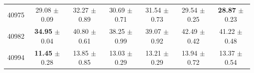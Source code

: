 \begin{table}[t]
\begin{tabular*}{\textwidth}{@{\extracolsep{\fill}}rcccccc@{}}
40975 & 29.08 $\pm$ 0.09 & 32.27 $\pm$ 0.89 & 30.69 $\pm$ 0.71 & 31.54 $\pm$ 0.73 & 29.54 $\pm$ 0.25 & \textbf{28.87} $\pm$ 0.23 \\
40982 & \textbf{34.95} $\pm$ 0.04 & 40.80 $\pm$ 0.61 & 38.25 $\pm$ 0.99 & 39.07 $\pm$ 0.92 & 42.49 $\pm$ 0.42 & 41.22 $\pm$ 0.48 \\
40994 & \textbf{11.45} $\pm$ 0.28 & 13.85 $\pm$ 0.85 & 13.03 $\pm$ 0.29 & 13.21 $\pm$ 0.29 & 13.94 $\pm$ 0.72 & 13.37 $\pm$ 0.54 \\
\bottomrule
\end{tabular*}
\end{table}
